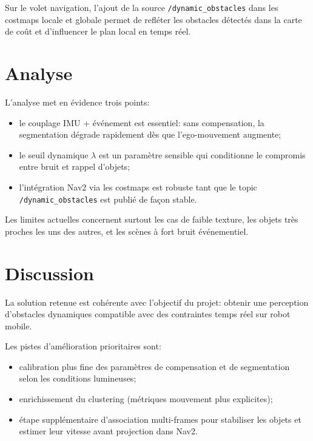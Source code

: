 Sur le volet navigation, l'ajout de la source
\texttt{/dynamic\_obstacles} dans les costmaps locale et globale permet de
refléter les obstacles détectés dans la carte de coût et d'influencer le plan
local en temps réel.

\section{Analyse}
L'analyse met en évidence trois points:
\begin{itemize}
\item le couplage IMU + événement est essentiel: sans compensation, la
segmentation dégrade rapidement dès que l'ego-mouvement augmente;
\item le seuil dynamique $\lambda$ est un paramètre sensible qui conditionne le
compromis entre bruit et rappel d'objets;
\item l'intégration Nav2 via les costmaps est robuste tant que le topic
\texttt{/dynamic\_obstacles} est publié de façon stable.
\end{itemize}

Les limites actuelles concernent surtout les cas de faible texture, les objets
très proches les uns des autres, et les scènes à fort bruit événementiel.

\section{Discussion}
La solution retenue est cohérente avec l'objectif du projet: obtenir une
perception d'obstacles dynamiques compatible avec des contraintes temps réel sur
robot mobile.

Les pistes d'amélioration prioritaires sont:
\begin{itemize}
\item calibration plus fine des paramètres de compensation et de segmentation
selon les conditions lumineuses;
\item enrichissement du clustering (métriques mouvement plus explicites);
\item étape supplémentaire d'association multi-frames pour stabiliser les objets
et estimer leur vitesse avant projection dans Nav2.
\end{itemize}
